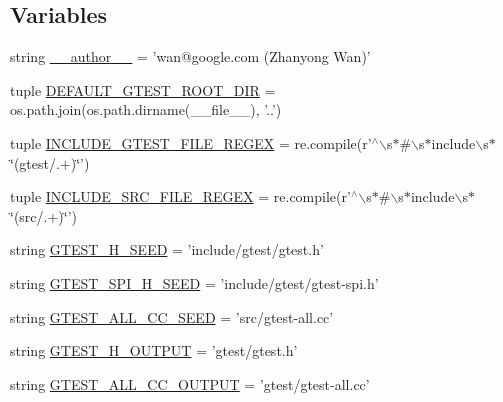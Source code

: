 \subsection*{\-Variables}
\begin{DoxyCompactItemize}
\item 
string \hyperlink{namespacefuse__gtest__files_a629d61dfe4da763164a4d1a2d85b0afd}{\-\_\-\-\_\-author\-\_\-\-\_\-} = 'wan@google.\-com (\-Zhanyong \-Wan)'
\item 
tuple \hyperlink{namespacefuse__gtest__files_a2325a613003d4d89aecad84735edb4dc}{\-D\-E\-F\-A\-U\-L\-T\-\_\-\-G\-T\-E\-S\-T\-\_\-\-R\-O\-O\-T\-\_\-\-D\-I\-R} = os.\-path.\-join(os.\-path.\-dirname(\-\_\-\-\_\-file\-\_\-\-\_\-), '..')
\item 
tuple \hyperlink{namespacefuse__gtest__files_a983f29a677c2102ca37cd2569fce51da}{\-I\-N\-C\-L\-U\-D\-E\-\_\-\-G\-T\-E\-S\-T\-\_\-\-F\-I\-L\-E\-\_\-\-R\-E\-G\-E\-X} = re.\-compile(r'$^\wedge$$\backslash$s$\ast$\#$\backslash$s$\ast$include$\backslash$s$\ast$\char`\"{}(gtest/.+)\char`\"{}')
\item 
tuple \hyperlink{namespacefuse__gtest__files_a2b8922a9d2e88c8a984465891895dbc1}{\-I\-N\-C\-L\-U\-D\-E\-\_\-\-S\-R\-C\-\_\-\-F\-I\-L\-E\-\_\-\-R\-E\-G\-E\-X} = re.\-compile(r'$^\wedge$$\backslash$s$\ast$\#$\backslash$s$\ast$include$\backslash$s$\ast$\char`\"{}(src/.+)\char`\"{}')
\item 
string \hyperlink{namespacefuse__gtest__files_a90f22503a30c2832ce04ebe8a53bc6eb}{\-G\-T\-E\-S\-T\-\_\-\-H\-\_\-\-S\-E\-E\-D} = 'include/gtest/gtest.\-h'
\item 
string \hyperlink{namespacefuse__gtest__files_a77159a6461aab0da30373554620c18fc}{\-G\-T\-E\-S\-T\-\_\-\-S\-P\-I\-\_\-\-H\-\_\-\-S\-E\-E\-D} = 'include/gtest/gtest-\/spi.\-h'
\item 
string \hyperlink{namespacefuse__gtest__files_acaf70978b4d299f368bb6ef035cf3588}{\-G\-T\-E\-S\-T\-\_\-\-A\-L\-L\-\_\-\-C\-C\-\_\-\-S\-E\-E\-D} = 'src/gtest-\/all.\-cc'
\item 
string \hyperlink{namespacefuse__gtest__files_aa0130025e290eed788baf38584dfd721}{\-G\-T\-E\-S\-T\-\_\-\-H\-\_\-\-O\-U\-T\-P\-U\-T} = 'gtest/gtest.\-h'
\item 
string \hyperlink{namespacefuse__gtest__files_a67d0dc122f66b2cab15c4edeb7243fed}{\-G\-T\-E\-S\-T\-\_\-\-A\-L\-L\-\_\-\-C\-C\-\_\-\-O\-U\-T\-P\-U\-T} = 'gtest/gtest-\/all.\-cc'
\end{DoxyCompactItemize}



